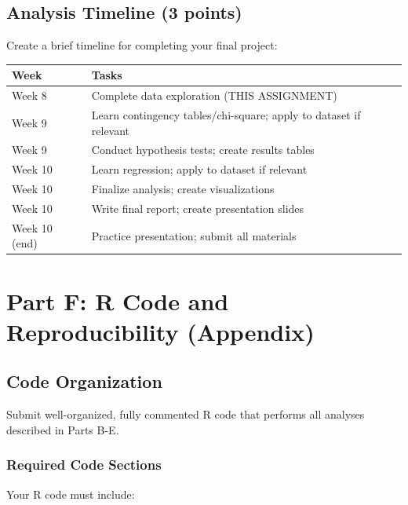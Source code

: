 \documentclass[11pt]{article}
\begin{document}
\subsection{Analysis Timeline (3 points)}

Create a brief timeline for completing your final project:

\begin{center}
\begin{tabular}{|l|p{9cm}|}
\hline
\textbf{Week} & \textbf{Tasks} \\
\hline
Week 8 & Complete data exploration (THIS ASSIGNMENT) \\
\hline
Week 9 & Learn contingency tables/chi-square; apply to dataset if relevant \\
\hline
Week 9 & Conduct hypothesis tests; create results tables \\
\hline
Week 10 & Learn regression; apply to dataset if relevant \\
\hline
Week 10 & Finalize analysis; create visualizations \\
\hline
Week 10 & Write final report; create presentation slides \\
\hline
Week 10 (end) & Practice presentation; submit all materials \\
\hline
\end{tabular}
\end{center}

\newpage

\section{Part F: R Code and Reproducibility (Appendix)}

\subsection{Code Organization}

Submit well-organized, fully commented R code that performs all analyses described in Parts B-E.

\subsubsection{Required Code Sections}

Your R code must include:
\end{document}
